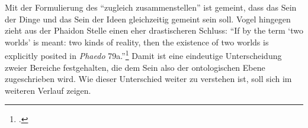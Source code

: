 Mit der Formulierung des \enquote{zugleich zusammenstellen} ist gemeint, dass das Sein der Dinge und das Sein der Ideen gleichzeitig gemeint sein soll.
Vogel hingegen zieht aus der Phaidon Stelle einen eher drastischeren Schluss:
\enquote{If by the term \enquote{two worlds} is meant: two kinds of reality, then the existence of two worlds is explicitly posited in \emph{Phaedo} 79a.}\footcite[][S. 161]{Vogel}
Damit ist eine eindeutige Unterscheidung zweier Bereiche festgehalten, die dem Sein also der ontologischen Ebene zugeschrieben wird. Wie dieser Unterschied weiter zu verstehen ist, soll sich im weiteren Verlauf zeigen.

